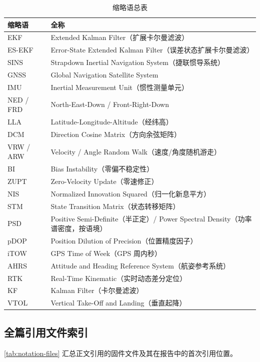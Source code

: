\begin{table}[H]
\centering
\caption{缩略语总表}
\label{tab:notation-acro}
\small
\begin{tabularx}{\textwidth}{@{}L{3.4cm}X@{}}
\toprule
\textbf{缩略语} & \textbf{全称} \\
\midrule
EKF & Extended Kalman Filter（扩展卡尔曼滤波）\\
ES-EKF & Error-State Extended Kalman Filter（误差状态扩展卡尔曼滤波）\\
SINS & Strapdown Inertial Navigation System（捷联惯导系统）\\
GNSS & Global Navigation Satellite System \\
IMU & Inertial Measurement Unit（惯性测量单元）\\
NED / FRD & North-East-Down / Front-Right-Down \\
LLA & Latitude-Longitude-Altitude（经纬高）\\
DCM & Direction Cosine Matrix（方向余弦矩阵）\\
VRW / ARW & Velocity / Angle Random Walk（速度/角度随机游走）\\
BI & Bias Instability（零偏不稳定性）\\
ZUPT & Zero-Velocity Update（零速修正）\\
NIS & Normalized Innovation Squared（归一化新息平方）\\
STM & State Transition Matrix（状态转移矩阵）\\
PSD & Positive Semi-Definite（半正定）/ Power Spectral Density（功率谱密度，按语境）\\
pDOP & Position Dilution of Precision（位置精度因子）\\
iTOW & GPS Time of Week（GPS 周内秒）\\
AHRS & Attitude and Heading Reference System（航姿参考系统）\\
RTK & Real-Time Kinematic（实时动态差分定位）\\
KF & Kalman Filter（卡尔曼滤波）\\
VTOL & Vertical Take-Off and Landing（垂直起降）\\
\bottomrule
\end{tabularx}
\end{table}

\subsection{全篇引用文件索引}

\cref{tab:notation-files} 汇总正文引用的固件文件及其在报告中的首次引用位置。

